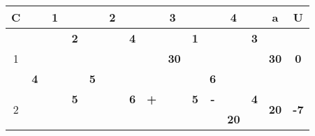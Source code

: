 \documentclass[a4paper, 12pt]{article}
\begin{document}
\begin{table}[H]
  \centering
    \begin{tabular}{|c|cccc|cccc|cccc|cccc|rr|}
    \hline
    C     & \multicolumn{4}{c|}{1}        & \multicolumn{4}{c|}{2}        & \multicolumn{4}{c|}{3}        & \multicolumn{4}{c|}{4}        & \multicolumn{1}{c|}{a} & \multicolumn{1}{c|}{U} \bigstrut\\
    \hline
    \multirow{4}[6]{*}{1} &       &       & \multicolumn{1}{r|}{} & \textbf{2} &       &       & \multicolumn{1}{r|}{} & \textbf{4} &       &       & \multicolumn{1}{r|}{} & \cellcolor[rgb]{ 1,  .753,  0}\textbf{1} &       &       & \multicolumn{1}{r|}{} & \cellcolor[rgb]{ 1,  .753,  0}\textbf{3} & \multicolumn{1}{c|}{\multirow{4}[6]{*}{\textbf{30}}} & \multicolumn{1}{c|}{\multirow{4}[6]{*}{\textbf{0}}} \bigstrut\\
\cline{5-5}\cline{9-9}\cline{13-13}\cline{17-17}          &       & \multicolumn{2}{c}{\multirow{2}[2]{*}{}} & \multirow{3}[4]{*}{} &       & \multicolumn{2}{c}{\multirow{2}[2]{*}{}} &       &       & \multicolumn{2}{c}{\multirow{2}[2]{*}{\textbf{30}}} &       &       & \multicolumn{2}{c}{\multirow{2}[2]{*}{}} &       & \multicolumn{1}{c|}{} &  \bigstrut[t]\\
          &       & \multicolumn{2}{c}{} &       &       & \multicolumn{2}{c}{} &       &       & \multicolumn{2}{c}{} &       &       & \multicolumn{2}{c}{} &       & \multicolumn{1}{c|}{} &  \bigstrut[b]\\
\cline{2-2}\cline{6-6}\cline{10-10}\cline{14-14}          & \multicolumn{1}{c|}{\textbf{4}} & \multicolumn{2}{c}{} &       & \multicolumn{1}{c|}{\textbf{5}} & \multicolumn{2}{c}{} &       & \multicolumn{1}{c|}{} & \multicolumn{2}{c}{} &       & \multicolumn{1}{c|}{\textbf{6}} & \multicolumn{2}{c}{} &       & \multicolumn{1}{c|}{} &  \bigstrut\\
    \hline
    \multirow{4}[6]{*}{2} &       &       & \multicolumn{1}{r|}{} & \textbf{5} &       &       & \multicolumn{1}{r|}{} & \textbf{6} & \multicolumn{1}{c|}{\cellcolor[rgb]{ 1,  0,  0}\textbf{+}} &       & \multicolumn{1}{r|}{} & \cellcolor[rgb]{ 1,  1,  0}\textbf{5} & \multicolumn{1}{c|}{\cellcolor[rgb]{ 1,  0,  0}\textbf{-}} &       & \multicolumn{1}{r|}{} & \cellcolor[rgb]{ .439,  .678,  .278}\textbf{4} & \multicolumn{1}{c|}{\multirow{4}[6]{*}{\textbf{20}}} & \multicolumn{1}{c|}{\multirow{4}[6]{*}{\textbf{-7}}} \bigstrut\\
\cline{5-5}\cline{9-10}\cline{13-14}\cline{17-17}          &       & \multicolumn{2}{c}{\multirow{2}[2]{*}{}} &       &       & \multicolumn{2}{c}{\multirow{2}[2]{*}{}} &       &       & \multicolumn{2}{c}{\multirow{2}[2]{*}{}} & \multirow{3}[4]{*}{} &       & \multicolumn{2}{c}{\multirow{2}[2]{*}{\textbf{20}}} &       & \multicolumn{1}{c|}{} &  \bigstrut[t]\\

\end{tabular}
\end{table}
\end{document}
